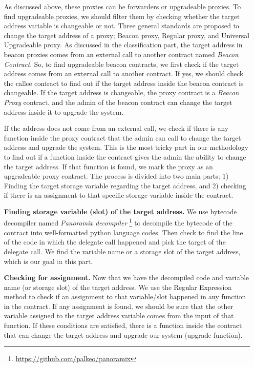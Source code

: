 As discussed above, these proxies can be forwarders or upgradeable proxies. To find upgradeable proxies, we should filter them by checking whether the target address variable is changeable or not. Three general standards are proposed to change the target address of a proxy; Beacon proxy, Regular proxy, and Universal Upgradeable proxy. 
As discussed in the classification part, the target address in beacon proxies comes from an external call to another contract named \textit{Beacon Contract}. So, to find upgradeable beacon contracts, we first check if the target address comes from an external call to another contract. If yes, we should check the callee contract to find out if the target address inside the beacon contract is changeable. If the target address is changeable, the proxy contract is a \textit{Beacon Proxy} contract, and the admin of the beacon contract can change the target address inside it to upgrade the system. 

If the address does not come from an external call, we check if there is any function inside the proxy contract that the admin can call to change the target address and upgrade the system. This is the most tricky part in our methodology to find out if a function inside the contract gives the admin the ability to change the target address. If that function is found, we mark the proxy as an upgradeable proxy contract. The process is divided into two main parts; 1) Finding the target storage variable regarding the target address, and 2) checking if there is an assignment to that specific storage variable inside the contract.

\textbf{Finding storage variable (slot) of the target address.} We use bytecode decompiler named \textit{Panoramix decompiler} \footnote{\url{https://github.com/palkeo/panoramix}} to decompile the bytecode of the contract into well-formatted python language codes. Then check to find the line of the code in which the delegate call happened and pick the target of the delegate call. We find the variable name or a storage slot of the target address, which is our goal in this part.

\textbf{Checking for assignment.} Now that we have the decompiled code and variable name (or storage slot) of the target address. We use the Regular Expression method to check if an assignment to that variable/slot happened in any function in the contract. If any assignment is found, we should be sure that the other variable assigned to the target address variable comes from the input of that function. If these conditions are satisfied, there is a function inside the contract that can change the target address and upgrade our system (upgrade function).

